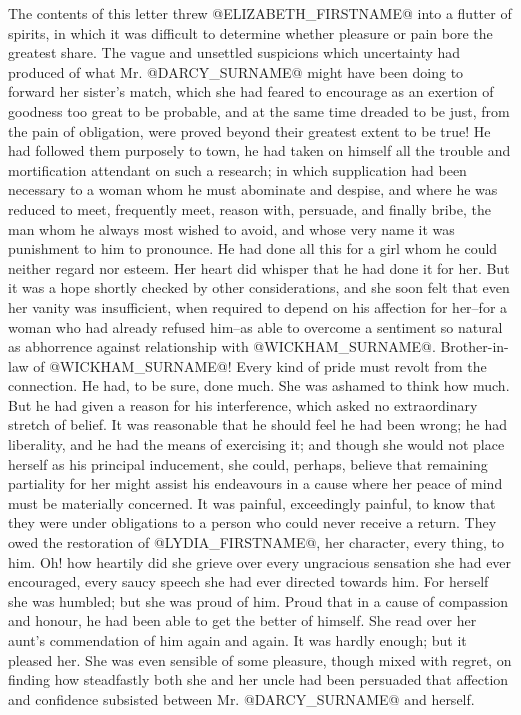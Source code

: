 The contents of this letter threw @ELIZABETH_FIRSTNAME@ into a flutter of spirits,
in which it was difficult to determine whether pleasure or pain bore the
greatest share. The vague and unsettled suspicions which uncertainty had
produced of what Mr. @DARCY_SURNAME@ might have been doing to forward her sister's
match, which she had feared to encourage as an exertion of goodness too
great to be probable, and at the same time dreaded to be just, from the
pain of obligation, were proved beyond their greatest extent to be true!
He had followed them purposely to town, he had taken on himself all
the trouble and mortification attendant on such a research; in which
supplication had been necessary to a woman whom he must abominate and
despise, and where he was reduced to meet, frequently meet, reason
with, persuade, and finally bribe, the man whom he always most wished to
avoid, and whose very name it was punishment to him to pronounce. He had
done all this for a girl whom he could neither regard nor esteem. Her
heart did whisper that he had done it for her. But it was a hope shortly
checked by other considerations, and she soon felt that even her vanity
was insufficient, when required to depend on his affection for her--for
a woman who had already refused him--as able to overcome a sentiment so
natural as abhorrence against relationship with @WICKHAM_SURNAME@. Brother-in-law
of @WICKHAM_SURNAME@! Every kind of pride must revolt from the connection. He had,
to be sure, done much. She was ashamed to think how much. But he had
given a reason for his interference, which asked no extraordinary
stretch of belief. It was reasonable that he should feel he had been
wrong; he had liberality, and he had the means of exercising it; and
though she would not place herself as his principal inducement, she
could, perhaps, believe that remaining partiality for her might assist
his endeavours in a cause where her peace of mind must be materially
concerned. It was painful, exceedingly painful, to know that they were
under obligations to a person who could never receive a return. They
owed the restoration of @LYDIA_FIRSTNAME@, her character, every thing, to him. Oh!
how heartily did she grieve over every ungracious sensation she had ever
encouraged, every saucy speech she had ever directed towards him. For
herself she was humbled; but she was proud of him. Proud that in a cause
of compassion and honour, he had been able to get the better of himself.
She read over her aunt's commendation of him again and again. It
was hardly enough; but it pleased her. She was even sensible of some
pleasure, though mixed with regret, on finding how steadfastly both she
and her uncle had been persuaded that affection and confidence subsisted
between Mr. @DARCY_SURNAME@ and herself.

